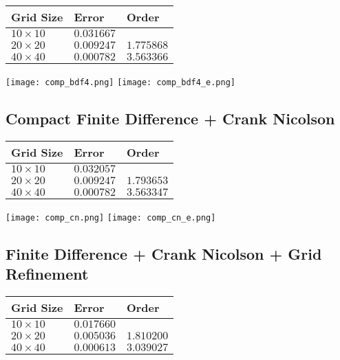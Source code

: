 \documentclass[12pt]{article}
\begin{document}
\begin{center}
    \begin{tabular}{|l|l|l|}
\hline Grid Size & Error & Order \\
\hline $10 \times 10$ & $0.031667$ & \\
\hline $20 \times 20$ & $0.009247$ & $1.775868$ \\
\hline $40 \times 40$ & $0.000782$ & $3.563366$ \\
\hline
\end{tabular}
\end{center}

\texttt{[image: comp\_bdf4.png]}
\texttt{[image: comp\_bdf4\_e.png]}

\subsection{Compact Finite Difference + Crank Nicolson}

\begin{center}
    \begin{tabular}{|l|l|l|}
\hline Grid Size & Error & Order \\
\hline $10 \times 10$ & $0.032057$ & \\
\hline $20 \times 20$ & $0.009247$ & $1.793653$ \\
\hline $40 \times 40$ & $0.000782$ & $3.563347$ \\
\hline
\end{tabular}
\end{center}


\texttt{[image: comp\_cn.png]}
\texttt{[image: comp\_cn\_e.png]}

\subsection{Finite Difference + Crank Nicolson + Grid Refinement} 


\begin{center}
    \begin{tabular}{|l|l|l|}
\hline Grid Size & Error & Order \\
\hline $10 \times 10$ & $0.017660$ & \\
\hline $20 \times 20$ & $0.005036$ & $1.810200$ \\
\hline $40 \times 40$ & $0.000613$ & $3.039027$ \\
\hline
\end{tabular}
\end{center}
\end{document}
